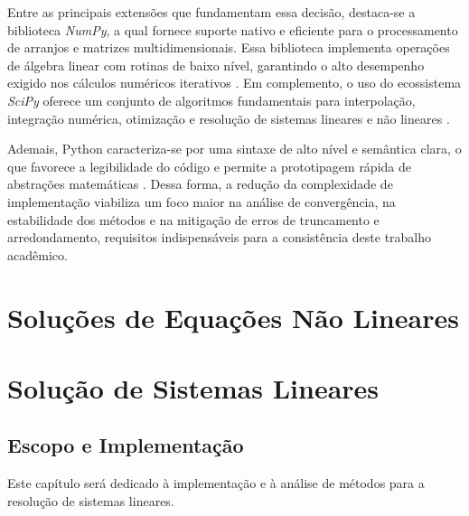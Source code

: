 \documentclass[a4paper,12pt]{report}
\begin{document}
Entre as principais extensões que fundamentam essa decisão, destaca-se a biblioteca \textit{NumPy}, a qual fornece suporte nativo e eficiente para o processamento de arranjos e matrizes multidimensionais. Essa biblioteca implementa operações de álgebra linear com rotinas de baixo nível, garantindo o alto desempenho exigido nos cálculos numéricos iterativos \cite{harris2020array}. Em complemento, o uso do ecossistema \textit{SciPy} oferece um conjunto de algoritmos fundamentais para interpolação, integração numérica, otimização e resolução de sistemas lineares e não lineares \cite{virtanen2020scipy}.

Ademais, Python caracteriza-se por uma sintaxe de alto nível e semântica clara, o que favorece a legibilidade do código e permite a prototipagem rápida de abstrações matemáticas \cite{johansson2018numerical}. Dessa forma, a redução da complexidade de implementação viabiliza um foco maior na análise de convergência, na estabilidade dos métodos e na mitigação de erros de truncamento e arredondamento, requisitos indispensáveis para a consistência deste trabalho acadêmico.

% 
\chapter{Solu\c{c}\~oes de Equa\c{c}\~oes N\~ao Lineares}



\newpage


\newpage



\newpage


\newpage


\newpage

\newpage
\chapter{Solu\c{c}\~ao de Sistemas Lineares}

\section{Escopo e Implementa\c{c}\~ao}

Este cap\'itulo ser\'a dedicado \`a implementa\c{c}\~ao e \`a an\'alise de m\'etodos para a resolu\c{c}\~ao de sistemas lineares.


\newpage
\end{document}
